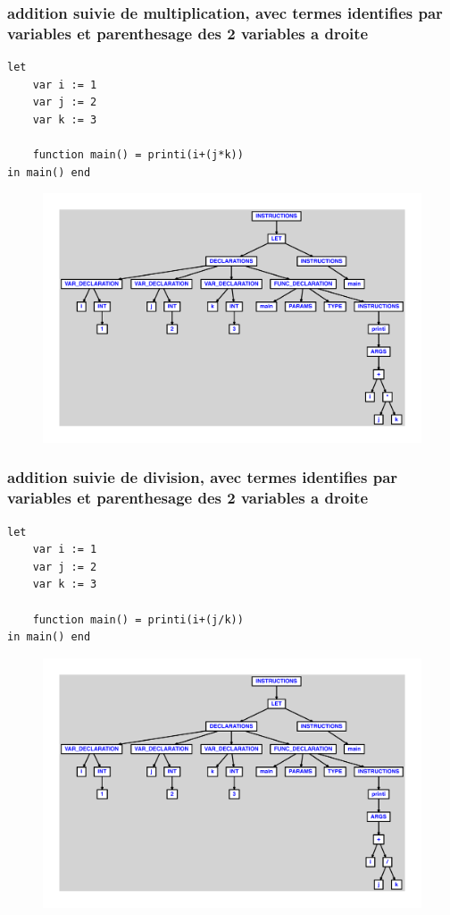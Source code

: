 \documentclass{article}
\begin{document}
\subsubsection{addition suivie de multiplication, avec termes identifies par variables et parenthesage des 2 variables a droite}
\begin{lstlisting}
let
	var i := 1
	var j := 2
	var k := 3

	function main() = printi(i+(j*k))
in main() end
\end{lstlisting}
\newpage
\begin{figure}[H]
\centering
\includegraphics[max width=\textwidth]{ast/ast_113.pdf}
\end{figure}
\newpage
\subsubsection{addition suivie de division, avec termes identifies par variables et parenthesage des 2 variables a droite}
\begin{lstlisting}
let
	var i := 1
	var j := 2
	var k := 3

	function main() = printi(i+(j/k))
in main() end
\end{lstlisting}
\newpage
\begin{figure}[H]
\centering
\includegraphics[max width=\textwidth]{ast/ast_114.pdf}
\end{figure}
\newpage
\end{document}
